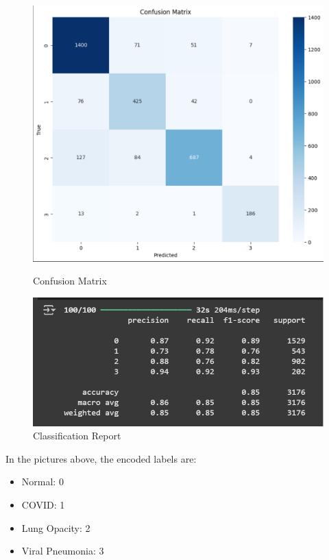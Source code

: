 \documentclass{article}
\begin{document}
\begin{figure}[H]
    \centering
    \begin{minipage}[t]{0.48\textwidth}
        \centering
        \includegraphics[width=\linewidth]{DN121cm2.png}
        \caption{Confusion Matrix}
        \label{fig:DN121cm2}
    \end{minipage}
    \hfill
    \begin{minipage}[t]{0.48\textwidth}
        \centering
        \includegraphics[width=\linewidth]{DN121cr2.png}
        \caption{Classification Report}
        \label{fig:DN121cr2}
    \end{minipage}
\end{figure}

In the pictures above, the encoded labels are:
\begin{itemize}
    \item Normal: 0
    \item COVID: 1
    \item Lung Opacity: 2
    \item Viral Pneumonia: 3
\end{itemize}
\end{document}
